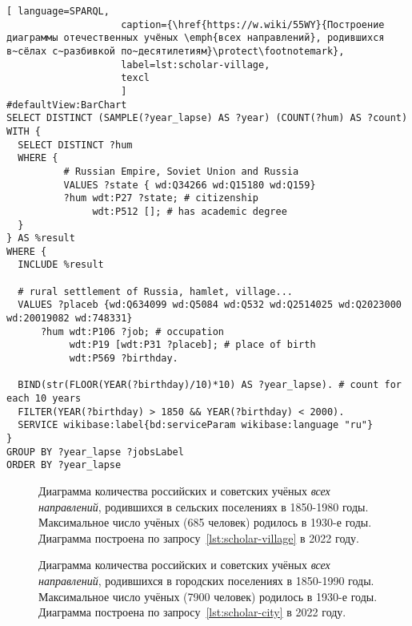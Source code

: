 \begin{fullwidth}
\begin{lstlisting}[ language=SPARQL, 
                    caption={\href{https://w.wiki/55WY}{Построение диаграммы отечественных учёных \emph{всех направлений}, родившихся в~сёлах с~разбивкой по~десятилетиям}\protect\footnotemark},
                    label=lst:scholar-village,
                    texcl 
                    ]
#defaultView:BarChart
SELECT DISTINCT (SAMPLE(?year_lapse) AS ?year) (COUNT(?hum) AS ?count) 
WITH {
  SELECT DISTINCT ?hum 
  WHERE {
          # Russian Empire, Soviet Union and Russia
          VALUES ?state { wd:Q34266 wd:Q15180 wd:Q159}
          ?hum wdt:P27 ?state; # citizenship
               wdt:P512 []; # has academic degree 
  }
} AS %result
WHERE {
  INCLUDE %result

  # rural settlement of Russia, hamlet, village...
  VALUES ?placeb {wd:Q634099 wd:Q5084 wd:Q532 wd:Q2514025 wd:Q2023000 wd:20019082 wd:748331}
      ?hum wdt:P106 ?job; # occupation
           wdt:P19 [wdt:P31 ?placeb]; # place of birth
           wdt:P569 ?birthday.
  
  BIND(str(FLOOR(YEAR(?birthday)/10)*10) AS ?year_lapse). # count for each 10 years
  FILTER(YEAR(?birthday) > 1850 && YEAR(?birthday) < 2000).
  SERVICE wikibase:label{bd:serviceParam wikibase:language "ru"}
}
GROUP BY ?year_lapse ?jobsLabel
ORDER BY ?year_lapse
\end{lstlisting}%
\end{fullwidth}


\begin{figure*}
    \setlength{\fboxsep}{0pt}%
    \setlength{\fboxrule}{1pt}%
	\label{fig:scholars-village-blue}
    \caption[Диаграмма количества отечественных учёных, родившихся в сёлах.]{Диаграмма количества российских и советских учёных \emph{всех направлений}, родившихся в сельских поселениях в 1850-1980 годы. Максимальное число учёных (685 человек) родилось в 1930-е годы. Диаграмма построена по запросу~\protect\ref{lst:scholar-village} в 2022 году.}%
\end{figure*} 

\begin{figure*}
    \setlength{\fboxsep}{0pt}%
    \setlength{\fboxrule}{1pt}%
	\label{fig:scholars-city-blue}
    \caption[Диаграмма количества отечественных учёных, родившихся в городах.]{Диаграмма количества российских и советских учёных \emph{всех направлений}, родившихся в городских поселениях в 1850-1990 годы. Максимальное число учёных (7900 человек) родилось в 1930-е годы. Диаграмма построена по запросу~\protect\ref{lst:scholar-city} в 2022 году.}%
\end{figure*} 

